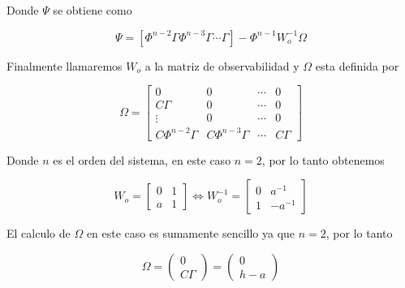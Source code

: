 \documentclass[11pt,a4paper]{article}
\begin{document}
        Donde $\Psi$ se obtiene como 
        
        \begin{equation}
            \Psi = [ \Phi^{n-2}\Gamma \Phi^{n-3} \Gamma \cdots \Gamma ] - \Phi^{n-1}W_o^{-1}\Omega
        \end{equation}

        Finalmente llamaremos $W_o$ a la matriz de observabilidad y $\Omega$ esta definida por 

        \begin{equation}
            \Omega = 
            \begin{bmatrix}
                0 & 0 & \cdots & 0 \\ 
                C\Gamma & 0 & \cdots & 0 \\ 
                \vdots & 0 & \cdots & 0 \\ 
                C \Phi^{n-2} \Gamma & C \Phi^{n-3} \Gamma & \cdots & C \Gamma 
            \end{bmatrix}
        \end{equation}

        Donde $n$ es el orden del sistema, en este caso $n=2$, por lo tanto obtenemos 
        
        \begin{equation}
            W_o = 
            \begin{bmatrix}
                0 & 1 \\ 
                a & 1 
            \end{bmatrix}
            \Leftrightarrow
            W_o^{-1} = 
            \begin{bmatrix}
                0 & a^{-1} \\
                1 & -a^{-1}
            \end{bmatrix}
        \end{equation}

        El calculo de $\Omega$ en este caso es sumamente sencillo ya que $n=2$, por lo tanto 

        \begin{equation}
            \Omega = 
            \begin{pmatrix}
                0 \\
                C\Gamma
            \end{pmatrix}
            =
            \begin{pmatrix}
                0 \\
                h-a                
            \end{pmatrix}
        \end{equation}
\end{document}
